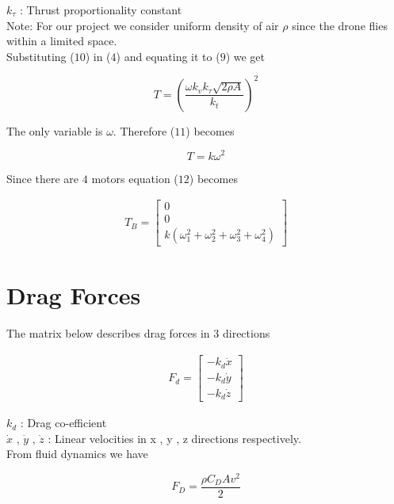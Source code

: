 \documentclass[9pt]{article}
\begin{document}
\noindent $k_{\tau}$ : Thrust proportionality constant\\

\noindent Note: For our project we consider uniform density of air $\rho$ since the drone flies within a limited space.\\ 

\noindent Substituting ($10$) in ($4$) and equating it to ($9$) we get

\begin{equation}
T = \left(\frac{\omega k_{v} k_{\tau} \sqrt{2 \rho A}}{k_{t}}\right)^{2}
\end{equation}

\noindent The only variable is $\omega$. Therefore ($11$) becomes

\begin{equation}
T = k\omega^{2}
\end{equation}

\noindent Since there are $4$ motors equation ($12$) becomes 

\begin{eqnarray}
T_{B} = 
\left[
\begin{matrix}
0 \\
0 \\
k(\omega_{1}^{2} + \omega_{2}^{2} + \omega_{3}^{2} + \omega_{4}^{2})  
\end{matrix}
\right]
\end{eqnarray}

\section{Drag Forces}

\noindent The matrix below describes drag forces in $3$ directions

\begin{eqnarray}
F_{d} =
\left[
\begin{matrix}
-k_{d}\dot{x} \\
-k_{d}\dot{y} \\
-k_{d}\dot{z}
\end{matrix}
\right]
\end{eqnarray}

\noindent $k_{d}$ : Drag co-efficient \\
$\dot{x}$ , $\dot{y}$ , $\dot{z}$ : Linear velocities in x , y , z directions respectively. \\

\noindent From fluid dynamics we have
 
\begin{equation}
F_{D} = \frac{\rho C_{D}Av^{2}}{2}
\end{equation}
\end{document}
